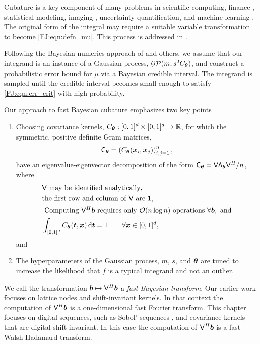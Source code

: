 \documentclass[graybox,footinfo]{svmult}
\newcommand{\JRNote}[1]{{\textcolor{green}{JR: #1}}}
\begin{document}
Cubature is a key component of many problems in scientific computing, finance \cite{Gla03}, statistical modeling, imaging \cite{Keller2013}, uncertainty quantification, and machine learning \cite{Goodfellow-et-al-2016}. 
The original form of the integral may require a suitable variable transformation to become \eqref{FJ:eqn:defn_mu}. This process is addressed in \cite{BecHae92b, CriEtal07, Lau96a,  Sid93, Sid08a}. 

Following the Bayesian numerics approach of \cite{BriEtal18a, Dia88a, OHa91a, RasGha03a} and others, we assume that our integrand is an instance of a Gaussian process, $\mathcal{GP}(m,s^2 C_{\boldsymbol{\theta}})$, and construct a probabilistic error bound for $\mu$ via a Bayesian credible interval.  The integrand is sampled until the credible interval becomes small enough to satisfy \eqref{FJ:eqn:err_crit} with high probability.  

Our approach to fast Bayesian cubature \cite{RatHic19a} emphasizes two key points
\begin{enumerate}
\renewcommand{\labelenumi}{\roman{enumi})}
    \item Choosing covariance kernels, $C_{\boldsymbol{\theta}}:[0,1]^d \times [0,1]^d \to {\mathbb{R}}$, for which the symmetric, positive definite Gram matrices, 
    \begin{equation} \label{FJ:eq:Gram}
        \mathsf{C}_\bstheta = \left(  C_\bstheta(\bsx_i,\bsx_j)  \right)_{i,j=1}^n,
    \end{equation}
    have an eigenvalue-eigenvector decomposition of the form $\mathsf{C}_{\boldsymbol{\theta}} = \mathsf{V} \mathsf{\Lambda}_{\boldsymbol{\theta}} \mathsf{V}^H/n$, where
    \begin{subequations} \label{FJ:eq:fastcompAssump}
	\begin{align}
	\label{FJ:eq:fastcompAssumpA}
	& \mathsf{V} \text{ may be identified analytically}, \\
	\label{FJ:eq:fastcompAssumpB}
	& \text{the first row and column of $\mathsf{V}$ are } \bsone, \\
	\label{FJ:eq:fastcompAssumpC}
	& \text{ Computing $\mathsf{V}^H \bsb$ requires only $\calO(n \log n)$ operations } \forall \bsb, \text{ and} \\
	\label{FJ:addAssump}
    & \int_{[0,1]^d} C_\bstheta(\bst,\bsx) \, \D \bst = 1 \qquad \forall \bsx \in [0,1]^d,
	\end{align}
\end{subequations}
and
\item The hyperparameters of the Gaussian process, $m$, $s$, and ${\boldsymbol{\theta}}$ are tuned to increase the likelihood that $f$ is a typical integrand and not an outlier.
\end{enumerate}
We call the transformation ${\boldsymbol{b}} \mapsto \mathsf{V}^H {\boldsymbol{b}}$ a \emph{fast Bayesian transform}. Our earlier work \cite{RatHic19a} focuses on lattice nodes and shift-invariant kernels. In that context the computation of $\mathsf{V}^H {\boldsymbol{b}}$ is a one-dimensional fast Fourier transform.  This chapter focuses on digital sequences, such as Sobol' sequences \cite{Sob67}, and covariance kernels that are digital shift-invariant.  In this case the computation of $\mathsf{V}^H {\boldsymbol{b}}$ is a fast Walsh-Hadamard transform. 
\end{document}
